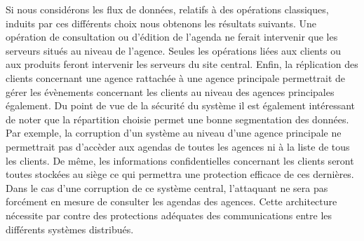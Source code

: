 Si nous considérons les flux de données, relatifs à des opérations classiques, induits par ces différents choix nous obtenons les résultats suivants. Une opération de consultation ou d'édition de l'agenda ne ferait intervenir que les serveurs situés au niveau de l'agence. Seules les opérations liées aux clients ou aux produits feront intervenir les serveurs du site central. Enfin, la réplication des clients concernant une agence rattachée à une agence principale permettrait de gérer les évènements concernant les clients au niveau des agences principales également.
Du point de vue de la sécurité du système il est également intéressant de noter que la répartition choisie permet une bonne segmentation des données. Par exemple, la corruption d'un système au niveau d'une agence principale ne permettrait pas d'accèder aux agendas de toutes les agences ni à la liste de tous les clients. De même, les informations confidentielles concernant les clients seront toutes stockées au siège ce qui permettra une protection efficace de ces dernières. Dans le cas d'une corruption de ce système central, l'attaquant ne sera pas forcément en mesure de consulter les agendas des agences. Cette architecture nécessite par contre des protections adéquates des communications entre les différents systèmes distribués.

\restoregeometry